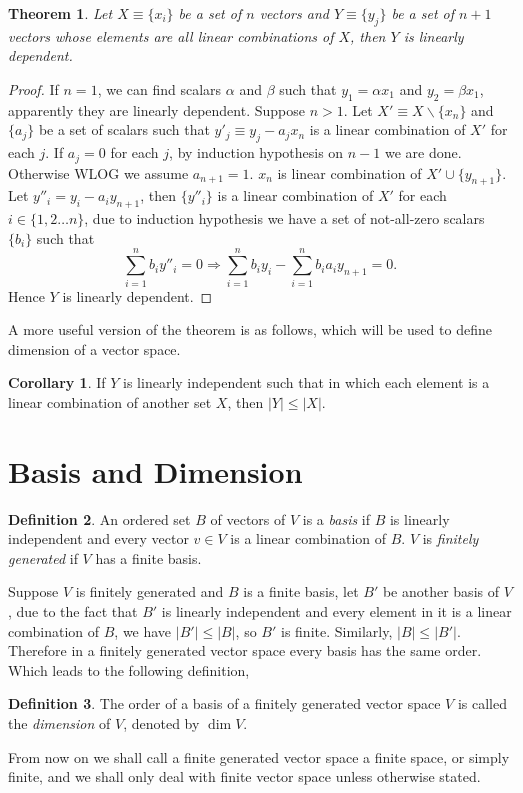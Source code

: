 \documentclass{amsbook}
\newtheorem{theorem}{Theorem}[chapter]
\theoremstyle{definition}
\newtheorem{definition}[theorem]{Definition}
\newtheorem{corollary}{Corollary}[theorem]
\theoremstyle{remark}
\numberwithin{section}{chapter}
\numberwithin{equation}{chapter}
\begin{document}
\begin{theorem}
	Let $X\equiv\{x_i\}$ be a set of $n$ vectors and $Y\equiv\{y_j\}$ be a set of $n + 1$ vectors whose elements are all linear combinations of $X$, then $Y$ is linearly dependent.
\end{theorem}
\begin{proof}
	If $n = 1$, we can find scalars $\alpha$ and $\beta$ such that $y_1 = \alpha x_1$ and $y_2 = \beta x_1$, apparently they are linearly dependent. Suppose $n > 1$. Let $X'\equiv X \backslash \{x_n\}$ and $\{a_j\}$ be a set of scalars such that $y'_j \equiv y_j - a_jx_n$ is a linear combination of $X'$ for each $j$. If $a_j = 0$ for each $j$, by induction hypothesis on $n - 1$ we are done. Otherwise WLOG we assume $a_{n + 1} = 1$. $x_n$ is linear combination of $X'\cup\{y_{n + 1}\}$.
	Let $y''_i = y_i - a_iy_{n + 1}$, then $\{y''_i\}$ is a linear combination of $X'$ for each $i\in	\{1,2\dots n\}$, due to induction hypothesis we have a set of not-all-zero scalars $\{b_i\}$ such that
	$$\sum_{i = 1}^{n}b_iy''_i = 0 \Rightarrow \sum_{i = 1}^{n}b_iy_i - \sum_{i = 1}^{n}b_ia_iy_{n + 1} = 0.$$
	Hence $Y$ is linearly dependent.
\end{proof}
A more useful version of the theorem is as follows, which will be used to define dimension of a vector space.
\begin{corollary}
	If $Y$ is linearly independent such that in which each element is a linear combination of another set $X$, then $|Y| \le |X|$.
\end{corollary}

\section{Basis and Dimension}
\begin{definition}
	An ordered set $B$ of vectors of $V$ is a \emph{basis} if $B$ is linearly independent and every vector $v\in V$ is a linear combination of $B$. $V$ is \emph{finitely generated} if $V$ has a finite basis. 
\end{definition}

Suppose $V$ is finitely generated and $B$ is a finite basis, let $B'$ be another basis of $V$, due to the fact that $B'$ is linearly independent and every element in it is a linear combination of $B$, we have $|B'| \le |B|$, so $B'$ is finite. Similarly, $|B| \le |B'|$. Therefore in a finitely generated vector space every basis has the same order. Which leads to the following definition,
\begin{definition}
	The order of a basis of a finitely generated vector space $V$ is called the \emph{dimension} of $V$, denoted by $\dim{V}$.
\end{definition}
From now on we shall call a finite generated vector space a finite space, or simply finite, and we shall only deal with finite vector space unless otherwise stated.
\end{document}
